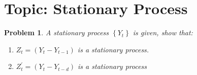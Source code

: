 \documentclass[11pt]{article}
\theoremstyle{plain} %
\newtheorem{problem}[theorem]{Problem}
\theoremstyle{remark}
\begin{document}
\begin{center}

	{}
\end{center}
\vspace{2em}

\tableofcontents

\section{Topic: Stationary Process}

\begin{problem}
A stationary process $\left\{Y_{t}\right\}$ is given, show that:
\begin{enumerate}[label = (\alph*)]
	\item $Z_t=\left(Y_{t}-Y_{t-1}\right)$ is a stationary process.
	\item $Z_{t}^{\prime} =\left(Y_{t}-Y_{t-d}\right)$ is a stationary process
\end{enumerate}
\end{problem}
\end{document}
